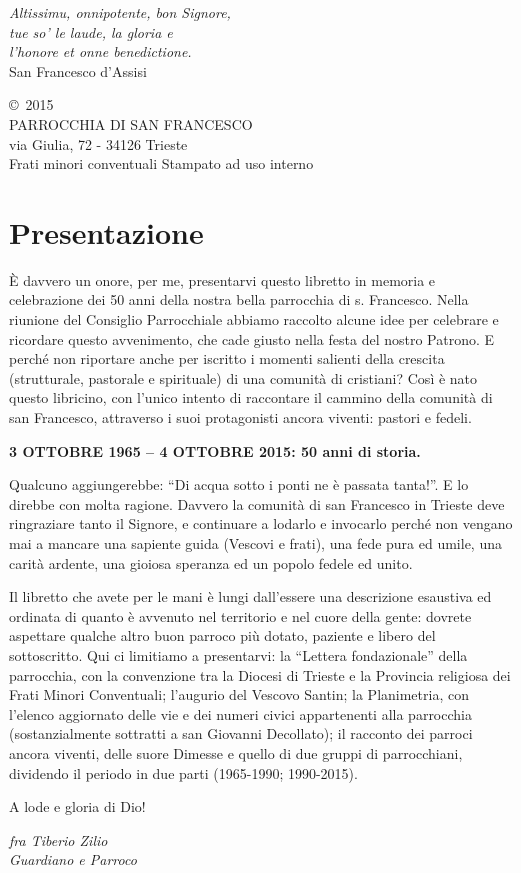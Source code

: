 \thispagestyle{empty}
\vspace*{15ex}
\begin{flushright}
\textit{Altissimu, onnipotente, bon Signore,\\
tue so’ le laude, la gloria e \\
l’honore et onne benedictione.\\}
\vspace{2ex}
\scriptsize{San Francesco d'Assisi}
\end{flushright}
\vfill
\small
\copyright\ 2015\\
PARROCCHIA DI SAN FRANCESCO\\
via Giulia, 72 - 34126 Trieste\\
Frati minori conventuali
\bigbreak 
\noindent Stampato ad uso interno
\cleardoublepage

\chapter*{Presentazione}
\label{chap:abstract}
È davvero un onore, per me, presentarvi questo libretto in memoria e celebrazione dei 
50 anni della nostra bella parrocchia di s. Francesco. Nella riunione del Consiglio Parrocchiale 
abbiamo raccolto alcune idee per celebrare e ricordare questo avvenimento, che cade giusto nella 
festa del nostro Patrono. E perché non riportare anche per iscritto i momenti salienti della crescita 
(strutturale, pastorale e spirituale) di una comunità di cristiani? Così è nato questo libricino, con 
l’unico intento di raccontare il cammino della comunità di san Francesco, attraverso i suoi 
protagonisti ancora viventi: pastori e fedeli.
\begin{center}
\bfseries
3 OTTOBRE 1965 – 4 OTTOBRE 2015: 50 anni di storia.
\end{center}

\noindent Qualcuno aggiungerebbe: “Di acqua sotto i ponti ne è passata tanta!”. E lo direbbe con molta 
ragione. Davvero la comunità di san Francesco in Trieste deve ringraziare tanto il Signore, e 
continuare a lodarlo e invocarlo perché non vengano mai a mancare una sapiente guida (Vescovi e 
frati), una fede pura ed umile, una carità ardente, una gioiosa speranza ed un popolo fedele ed unito. 

Il libretto che avete per le mani è lungi dall’essere una descrizione esaustiva ed ordinata di 
quanto è avvenuto nel territorio e nel cuore della gente: dovrete aspettare qualche altro buon 
parroco più dotato, paziente e libero del sottoscritto.
Qui ci limitiamo a presentarvi: la “Lettera fondazionale” della parrocchia, con la convenzione tra la 
Diocesi di Trieste e la Provincia religiosa dei Frati Minori Conventuali; l’augurio del Vescovo 
Santin; la Planimetria, con l’elenco aggiornato delle vie e dei numeri civici appartenenti alla 
parrocchia (sostanzialmente sottratti a san Giovanni Decollato); il racconto dei parroci  ancora 
viventi, delle suore Dimesse e quello di due gruppi di parrocchiani, dividendo il periodo in due parti 
(1965-1990; 1990-2015).
 
\noindent A lode e gloria di Dio!
\begin{flushright}
	\textit{fra Tiberio Zilio\\Guardiano e Parroco}
\end{flushright}